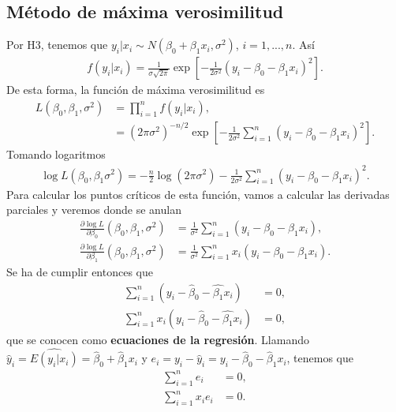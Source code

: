 \subsection{Método de máxima verosimilitud}
Por H3, tenemos que $y_i | x_i \sim N(\beta_0 + \beta_1 x_i, \sigma^2)$, $i=1,...,n$. Así
\begin{align*}
    f(y_i | x_i) = \frac{1}{\sigma\sqrt{2\pi}} \exp \left[ - \frac{1}{2\sigma^2}(y_i - \beta_0 - \beta_1 x_i)^2 \right].
\end{align*}
De esta forma, la función de máxima verosimilitud es
\begin{align*}
    L(\beta_0,\beta_1,\sigma^2) & = \prod_{i=1}^{n} f(y_i | x_i),                                                                                               \\
                                & = \left( 2\pi \sigma^2 \right)^{-n/2} \exp\left[ - \frac{1}{2\sigma^2} \sum_{i=1}^{n}(y_i - \beta_0 - \beta_1 x_i)^2 \right].
\end{align*}
Tomando logaritmos
\begin{align*}
    \log L(\beta_0,\beta_1\sigma^2) = - \frac{n}{2} \log\left(2\pi\sigma^2\right) - \frac{1}{2\sigma^2} \sum_{i=1}^{n}(y_i - \beta_0 - \beta_1 x_i)^2 .
\end{align*}
Para calcular los puntos críticos de esta función, vamos a calcular las derivadas parciales y veremos donde se anulan
\begin{align*}
    \frac{\partial \log L}{\partial \beta_0}(\beta_0,\beta_1,\sigma^2) & = \frac{1}{\sigma^2} \sum_{i=1}^{n}(y_i - \beta_0 - \beta_1 x_i),    \\
    \frac{\partial \log L}{\partial \beta_1}(\beta_0,\beta_1,\sigma^2) & = \frac{1}{\sigma^2} \sum_{i=1}^{n}x_i(y_i - \beta_0 - \beta_1 x_i).
\end{align*}
Se ha de cumplir entonces que
\begin{align*}
    \sum_{i=1}^{n}(y_i - \widehat{\beta}_0 - \widehat{\beta_1} x_i)    & = 0, \\
    \sum_{i=1}^{n}x_i(y_i - \widehat{\beta}_0 - \widehat{\beta_1} x_i) & = 0,
\end{align*}
que se conocen como \textbf{ecuaciones de la regresión}. Llamando $\widehat{y}_i = \widehat{E(y_i|x_i)} = \widehat{\beta}_0 + \widehat{\beta}_1 x_i$ y $e_i = y_i - \widehat{y}_i = y_i - \widehat{\beta}_0 - \widehat{\beta}_1x_i$, tenemos que
\begin{align*}
    \sum_{i=1}^{n} e_i   & = 0, \\
    \sum_{i=1}^{n}x_ie_i & = 0.
\end{align*}

